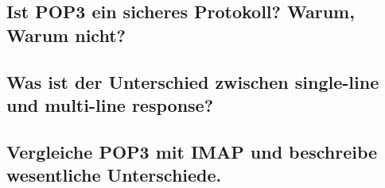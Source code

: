 \documentclass[11pt]{article}
\begin{document}
    \subsection{Ist POP3 ein sicheres Protokoll? Warum, Warum nicht?}

    \subsection{Was ist der Unterschied zwischen single-line und multi-line response?}

    \subsection{Vergleiche POP3 mit IMAP und beschreibe wesentliche Unterschiede.}
\end{document}

